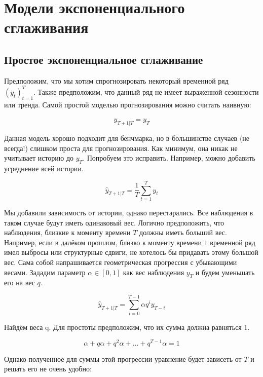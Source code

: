 \documentclass[12pt,fleqn]{article}
\newcounter{chapter}
\begin{document}
\setcounter{figure}{0}
\section{Модели экспоненциального сглаживания}
\subsection{Простое экспоненциальное сглаживание}

Предположим, что мы хотим спрогнозировать некоторый временной ряд $(y_t)_{t=1}^{T}$.
Также предположим, что данный ряд не имеет выраженной сезонности или тренда.
Самой простой моделью прогнозирования можно считать наивную:

\begin{equation}
  \hat{y}_{T+1|T} = y_T
\end{equation}

Данная модель хорошо подходит для бенчмарка, но в большинстве случаев (не всегда!) слишком проста для прогнозирования.
Как минимум, она никак не учитывает историю до $y_T$.
Попробуем это исправить.
Например, можно добавить усреднение всей истории.

\begin{equation}
  \hat{y}_{T+1|T} = \frac{1}{T}\sum_{t=1}^{T}y_t
\end{equation}

Мы добавили зависимость от истории, однако перестарались.
Все наблюдения в таком случае будут иметь одинаковый вес.
Логично предположить, что наблюдения, близкие к моменту времени $T$ должны иметь больший вес.
Например, если в далёком прошлом, близко к моменту времени $1$ временной ряд имел выбросы или структурные сдвиги, не хотелось бы придавать этому большой вес.
Сама собой напрашивается геометрическая прогрессия с убывающими весами.
Зададим параметр $\alpha \in [0, 1]$ как вес наблюдения $y_T$ и будем уменьшать его на вес $q$.

\begin{equation}
  \hat{y}_{T+1|T} =\sum_{i=0}^{T-1} \alpha q^{i} y_{T-i}
\end{equation}

Найдём веса q.
Для простоты предположим, что их сумма должна равняться 1.

\begin{equation}
  \alpha + q \alpha + q^2 \alpha + \ldots + q^{T-1} \alpha = 1
\end{equation}

Однако полученное для суммы этой прогрессии уравнение будет  зависеть от $T$ и решать его не очень удобно:
\end{document}

